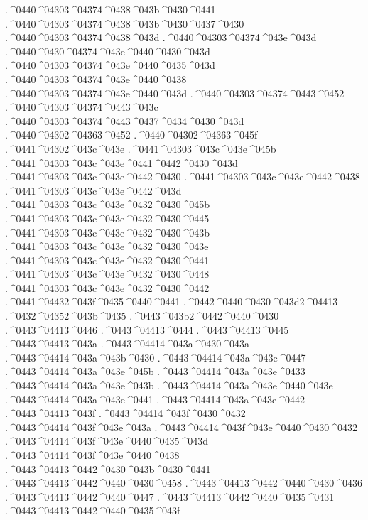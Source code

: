 {.^^^^0440^^^^04303^^^^04374^^^^0438^^^^043b^^^^0430^^^^0441
.^^^^0440^^^^04303^^^^04374^^^^0438^^^^043b^^^^0430^^^^0437^^^^0430
.^^^^0440^^^^04303^^^^04374^^^^0438^^^^043d
.^^^^0440^^^^04303^^^^04374^^^^043e^^^^043d
.^^^^0440^^^^0430^^^^04374^^^^043e^^^^0440^^^^0430^^^^043d
.^^^^0440^^^^04303^^^^04374^^^^043e^^^^0440^^^^0435^^^^043d
.^^^^0440^^^^04303^^^^04374^^^^043e^^^^0440^^^^0438
.^^^^0440^^^^04303^^^^04374^^^^043e^^^^0440^^^^043d
.^^^^0440^^^^04303^^^^04374^^^^0443^^^^0452
.^^^^0440^^^^04303^^^^04374^^^^0443^^^^043c
.^^^^0440^^^^04303^^^^04374^^^^0443^^^^0437^^^^0434^^^^0430^^^^043d
.^^^^0440^^^^04302^^^^04363^^^^0452
.^^^^0440^^^^04302^^^^04363^^^^045f
.^^^^0441^^^^04302^^^^043c^^^^043e
.^^^^0441^^^^04303^^^^043c^^^^043e^^^^045b
.^^^^0441^^^^04303^^^^043c^^^^043e^^^^0441^^^^0442^^^^0430^^^^043d
.^^^^0441^^^^04303^^^^043c^^^^043e^^^^0442^^^^0430
.^^^^0441^^^^04303^^^^043c^^^^043e^^^^0442^^^^0438
.^^^^0441^^^^04303^^^^043c^^^^043e^^^^0442^^^^043d
.^^^^0441^^^^04303^^^^043c^^^^043e^^^^0432^^^^0430^^^^045b
.^^^^0441^^^^04303^^^^043c^^^^043e^^^^0432^^^^0430^^^^0445
.^^^^0441^^^^04303^^^^043c^^^^043e^^^^0432^^^^0430^^^^043b
.^^^^0441^^^^04303^^^^043c^^^^043e^^^^0432^^^^0430^^^^043e
.^^^^0441^^^^04303^^^^043c^^^^043e^^^^0432^^^^0430^^^^0441
.^^^^0441^^^^04303^^^^043c^^^^043e^^^^0432^^^^0430^^^^0448
.^^^^0441^^^^04303^^^^043c^^^^043e^^^^0432^^^^0430^^^^0442
.^^^^0441^^^^04432^^^^043f^^^^0435^^^^0440^^^^0441
.^^^^0442^^^^0440^^^^0430^^^^043d2^^^^04413
.^^^^0432^^^^04352^^^^043b^^^^0435
.^^^^0443^^^^043b2^^^^0442^^^^0440^^^^0430
.^^^^0443^^^^04413^^^^0446
.^^^^0443^^^^04413^^^^0444
.^^^^0443^^^^04413^^^^0445
.^^^^0443^^^^04413^^^^043a
.^^^^0443^^^^04414^^^^043a^^^^0430^^^^043a
.^^^^0443^^^^04414^^^^043a^^^^043b^^^^0430
.^^^^0443^^^^04414^^^^043a^^^^043e^^^^0447
.^^^^0443^^^^04414^^^^043a^^^^043e^^^^045b
.^^^^0443^^^^04414^^^^043a^^^^043e^^^^0433
.^^^^0443^^^^04414^^^^043a^^^^043e^^^^043b
.^^^^0443^^^^04414^^^^043a^^^^043e^^^^0440^^^^043e
.^^^^0443^^^^04414^^^^043a^^^^043e^^^^0441
.^^^^0443^^^^04414^^^^043a^^^^043e^^^^0442
.^^^^0443^^^^04413^^^^043f
.^^^^0443^^^^04414^^^^043f^^^^0430^^^^0432
.^^^^0443^^^^04414^^^^043f^^^^043e^^^^043a
.^^^^0443^^^^04414^^^^043f^^^^043e^^^^0440^^^^0430^^^^0432
.^^^^0443^^^^04414^^^^043f^^^^043e^^^^0440^^^^0435^^^^043d
.^^^^0443^^^^04414^^^^043f^^^^043e^^^^0440^^^^0438
.^^^^0443^^^^04413^^^^0442^^^^0430^^^^043b^^^^0430^^^^0441
.^^^^0443^^^^04413^^^^0442^^^^0440^^^^0430^^^^0458
.^^^^0443^^^^04413^^^^0442^^^^0440^^^^0430^^^^0436
.^^^^0443^^^^04413^^^^0442^^^^0440^^^^0447
.^^^^0443^^^^04413^^^^0442^^^^0440^^^^0435^^^^0431
.^^^^0443^^^^04413^^^^0442^^^^0440^^^^0435^^^^043f
}
